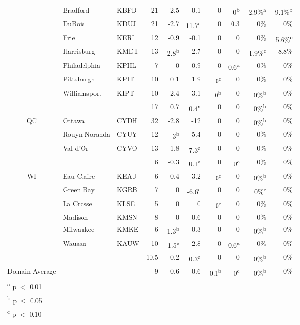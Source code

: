 \documentclass[twocol]{ametsoc}
\begin{document}
\begin{landscape}
\begin{table}[]
\begin{tabular}{@{}cllrrrrrrr@{}}
 & Bradford & KBFD & 21 & -2.5 & -0.1 & 0 & 0\textsuperscript{b} & -2.9\%\textsuperscript{a} & -9.1\%\textsuperscript{b} \\
 & DuBois & KDUJ & 21 & -2.7 & 11.7\textsuperscript{c} & 0 & 0.3 & 0\% & 0\% \\
 & Erie & KERI & 12 & -0.9 & -0.1 & 0 & 0 & 0\% & 5.6\%\textsuperscript{c} \\
 & Harrisburg & KMDT & 13 & 2.8\textsuperscript{b} & 2.7 & 0 & 0 & -1.9\%\textsuperscript{c} & -8.8\% \\
 & Philadelphia & KPHL & 7 & 0 & 0.9 & 0 & 0.6\textsuperscript{a} & 0\% & 0\% \\
 & Pittsburgh & KPIT & 10 & 0.1 & 1.9 & 0\textsuperscript{c} & 0 & 0\% & 0\% \\
 & Williamsport & KIPT & 10 & -2.4 & 3.1 & 0\textsuperscript{b} & 0 & 0\%\textsuperscript{b} & 0\% \\ \cmidrule(l){2-10} 
 &  &  & 17 & 0.7 & 0.4\textsuperscript{a} & 0 & 0 & 0\%\textsuperscript{b} & 0\% \\ \midrule
\multirow{4}{*}{QC} & Ottawa & CYDH & 32 & -2.8 & -12 & 0 & 0 & 0\%\textsuperscript{b} & 0\% \\
 & Rouyn-Noranda & CYUY & 12 & 3\textsuperscript{b} & 5.4 & 0 & 0 & 0\% & 0\% \\
 & Val-d'Or & CYVO & 13 & 1.8 & 7.3\textsuperscript{a} & 0 & 0 & 0\% & 0\% \\ \cmidrule(l){2-10} 
 &  &  & 6 & -0.3 & 0.1\textsuperscript{a} & 0 & 0\textsuperscript{c} & 0\% & 0\% \\ \midrule
\multirow{7}{*}{WI} & Eau Claire & KEAU & 6 & -0.4 & -3.2 & 0\textsuperscript{c} & 0 & 0\%\textsuperscript{b} & 0\% \\
 & Green Bay & KGRB & 7 & 0 & -6.6\textsuperscript{c} & 0 & 0 & 0\%\textsuperscript{c} & 0\% \\
 & La Crosse & KLSE & 5 & 0 & 0 & 0\textsuperscript{c} & 0 & 0\% & 0\% \\
 & Madison & KMSN & 8 & 0 & -0.6 & 0 & 0 & 0\% & 0\% \\
 & Milwaukee & KMKE & 6 & -1.3\textsuperscript{b} & -0.3 & 0 & 0 & 0\%\textsuperscript{b} & 0\% \\
 & Wausau & KAUW & 10 & 1.5\textsuperscript{c} & -2.8 & 0 & 0.6\textsuperscript{a} & 0\% & 0\% \\ \cmidrule(l){2-10} 
 &  &  & 10.5 & 0.2 & 0.3\textsuperscript{a} & 0 & 0 & 0\%\textsuperscript{b} & 0\% \\ \cmidrule(l){2-10} 
Domain Average &  &  & 9 & -0.6 & -0.6 & -0.1\textsuperscript{b} & 0\textsuperscript{c} & 0\%\textsuperscript{b} & 0\% \\ \bottomrule
\multicolumn{10}{l}{\textsuperscript{a} p $<$ 0.01} \\
\multicolumn{10}{l}{\textsuperscript{b} p $<$ 0.05} \\
\multicolumn{10}{l}{\textsuperscript{c} p $<$ 0.10}
\end{tabular}
\end{table}
\end{landscape}
\end{document}
